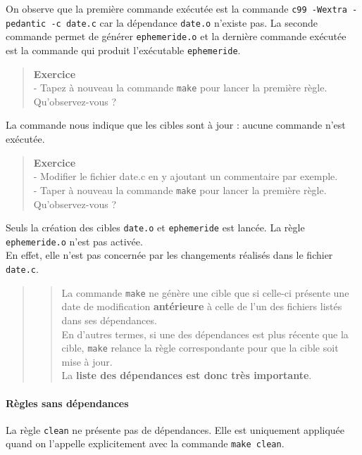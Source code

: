\documentclass[11pt]{article}
\begin{document}
On observe que la première commande exécutée est la commande
\texttt{c99\ -Wextra\ -pedantic\ -c\ date.c} car la dépendance
\texttt{date.o} n'existe pas. La seconde commande permet de générer
\texttt{ephemeride.o} et la dernière commande exécutée est la commande
qui produit l'exécutable \texttt{ephemeride}.

\begin{quote}
\textbf{Exercice}\\
- Tapez à nouveau la commande \texttt{make} pour lancer la première
règle. Qu'observez-vous ?
\end{quote}

La commande nous indique que les cibles sont à jour : aucune commande
n'est exécutée.

\begin{quote}
\textbf{Exercice}\\
- Modifier le fichier date.c en y ajoutant un commentaire par exemple.\\
- Taper à nouveau la commande \texttt{make} pour lancer la première
règle. Qu'observez-vous ?
\end{quote}

Seuls la création des cibles \texttt{date.o} et \texttt{ephemeride} est
lancée. La règle \texttt{ephemeride.o} n'est pas activée.\\
En effet, elle n'est pas concernée par les changements réalisés dans le
fichier \texttt{date.c}.

\begin{quote}
\begin{quote}
La commande \texttt{make} ne génère une cible que si celle-ci présente
une date de modification \textbf{antérieure} à celle de l'un des
fichiers listés dans ses dépendances.\\
En d'autres termes, si une des dépendances est plus récente que la
cible, \texttt{make} relance la règle correspondante pour que la cible
soit mise à jour.\\
La \textbf{liste des dépendances est donc très importante}.
\end{quote}
\end{quote}

\paragraph{Règles sans dépendances}\label{ruxe8gles-sans-duxe9pendances}

La règle \texttt{clean} ne présente pas de dépendances. Elle est
uniquement appliquée quand on l'appelle explicitement avec la commande
\texttt{make\ clean}.
\end{document}
